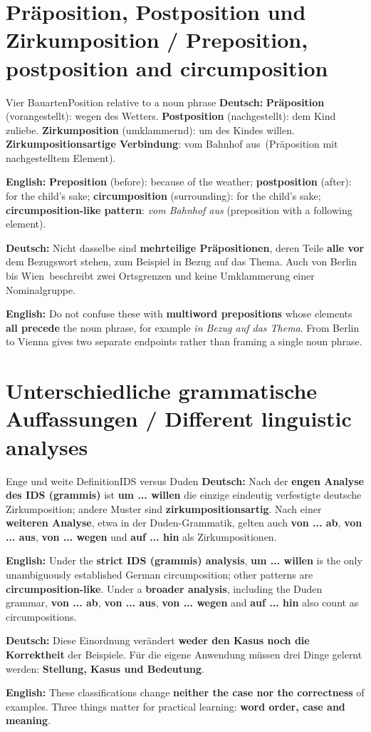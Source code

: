 \documentclass[a4paper,11pt]{article}
\newcommand{\GermanText}[1]{\textbf{Deutsch: }#1\par}
\newcommand{\EnglishText}[1]{{\small\color{SoftGray}\textbf{English: }#1\par}}
\begin{document}
\section{Präposition, Postposition und Zirkumposition / Preposition, postposition and circumposition}
\begin{grammarentry}{Vier Bauarten}{Position relative to a noun phrase}
\GermanText{\textbf{Präposition} (vorangestellt): \glqq wegen des Wetters\grqq. \textbf{Postposition} (nachgestellt): \glqq dem Kind zuliebe\grqq. \textbf{Zirkumposition} (umklammernd): \glqq um des Kindes willen\grqq. \textbf{Zirkumpositionsartige Verbindung}: \glqq vom Bahnhof aus\grqq\ (Präposition mit nachgestelltem Element).}
\EnglishText{\textbf{Preposition} (before): because of the weather; \textbf{postposition} (after): for the child's sake; \textbf{circumposition} (surrounding): for the child's sake; \textbf{circumposition-like pattern}: \emph{vom Bahnhof aus} (preposition with a following element).}
\GermanText{Nicht dasselbe sind \textbf{mehrteilige Präpositionen}, deren Teile \textbf{alle vor} dem Bezugswort stehen, zum Beispiel \glqq in Bezug auf das Thema\grqq. Auch \glqq von Berlin bis Wien\grqq\ beschreibt zwei Ortsgrenzen und keine Umklammerung einer Nominalgruppe.}
\EnglishText{Do not confuse these with \textbf{multiword prepositions} whose elements \textbf{all precede} the noun phrase, for example \emph{in Bezug auf das Thema}. From Berlin to Vienna gives two separate endpoints rather than framing a single noun phrase.}
\end{grammarentry}

\section{Unterschiedliche grammatische Auffassungen / Different linguistic analyses}
\begin{grammarentry}{Enge und weite Definition}{IDS versus Duden}
\GermanText{Nach der \textbf{engen Analyse des IDS (grammis)} ist \textbf{um ... willen} die einzige eindeutig verfestigte deutsche Zirkumposition; andere Muster sind \textbf{zirkumpositionsartig}. Nach einer \textbf{weiteren Analyse}, etwa in der Duden-Grammatik, gelten auch \textbf{von ... ab}, \textbf{von ... aus}, \textbf{von ... wegen} und \textbf{auf ... hin} als Zirkumpositionen.}
\EnglishText{Under the \textbf{strict IDS (grammis) analysis}, \textbf{um ... willen} is the only unambiguously established German circumposition; other patterns are \textbf{circumposition-like}. Under a \textbf{broader analysis}, including the Duden grammar, \textbf{von ... ab}, \textbf{von ... aus}, \textbf{von ... wegen} and \textbf{auf ... hin} also count as circumpositions.}
\GermanText{Diese Einordnung verändert \textbf{weder den Kasus noch die Korrektheit} der Beispiele. Für die eigene Anwendung müssen drei Dinge gelernt werden: \textbf{Stellung, Kasus und Bedeutung}.}
\EnglishText{These classifications change \textbf{neither the case nor the correctness} of examples. Three things matter for practical learning: \textbf{word order, case and meaning}.}
\end{grammarentry}
\end{document}
